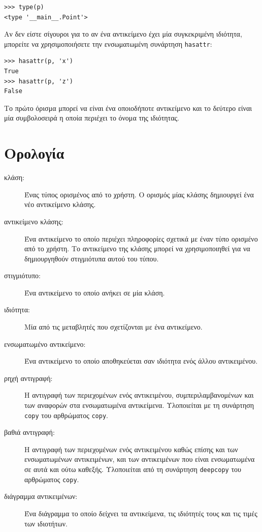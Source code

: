 \documentclass[10pt]{book}
\begin{document}
\begin{verbatim}
>>> type(p)
<type '__main__.Point'>
\end{verbatim}
%
 Αν δεν είστε σίγουροι για το αν ένα αντικείμενο έχει μία συγκεκριμένη ιδιότητα, 
μπορείτε να χρησιμοποιήσετε την ενσωματωμένη συνάρτηση  {\tt hasattr}:

\begin{verbatim}
>>> hasattr(p, 'x')
True
>>> hasattr(p, 'z')
False
\end{verbatim}
%
 Το πρώτο όρισμα μπορεί να είναι ένα οποιοδήποτε αντικείμενο και το δεύτερο είναι μία 
συμβολοσειρά η οποία περιέχει το όνομα της ιδιότητας.



\section{Ορολογία}

\begin{description}

\item[κλάση:] Ένας τύπος ορισμένος από το χρήστη.  Ο ορισμός μίας κλάσης δημιουργεί ένα νέο  αντικείμενο κλάσης.

\item[αντικείμενο κλάσης:]  Ένα αντικείμενο το οποίο περιέχει πληροφορίες σχετικά με έναν τύπο ορισμένο από το χρήστη.  Το αντικείμενο της κλάσης μπορεί να χρησιμοποιηθεί για να δημιουργηθούν στιγμιότυπα αυτού του τύπου.

\item[στιγμιότυπο:] Ένα αντικείμενο το οποίο ανήκει σε μία κλάση.

\item[ιδιότητα:] Μία από τις μεταβλητές που σχετίζονται με ένα αντικείμενο.

\item[ενσωματωμένο αντικείμενο:] Ένα αντικείμενο το οποίο αποθηκεύεται σαν ιδιότητα ενός 
άλλου αντικειμένου.

\item[ρηχή αντιγραφή:] Η αντιγραφή των περιεχομένων ενός αντικειμένου, συμπεριλαμβανομένων και των αναφορών στα ενσωματωμένα αντικείμενα.  Υλοποιείται με τη συνάρτηση  {\tt copy}  του 
αρθρώματος  {\tt copy}.

\item[βαθιά αντιγραφή:] Η αντιγραφή των περιεχομένων ενός αντικειμένου καθώς επίσης και των  ενσωματωμένων αντικειμένων, και των αντικειμένων που είναι ενσωματωμένα σε αυτά και ούτω καθεξής.  Υλοποιείται από τη συνάρτηση  {\tt deepcopy}  του αρθρώματος  {\tt copy}. 

\item[διάγραμμα αντικειμένων:] Ένα διάγραμμα το οποίο δείχνει τα αντικείμενα, τις ιδιότητές τους και τις τιμές των ιδιοτήτων.

\end{description}
\end{document}
